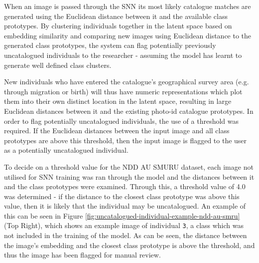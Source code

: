 When an image is passed through the SNN its most likely catalogue matches are generated using the Euclidean distance between it and the available class prototypes. By clustering individuals together in the latent space based on embedding similarity and comparing new images using Euclidean distance to the generated class prototypes, the system can flag potentially previously uncatalogued individuals to the researcher - assuming the model has learnt to generate well defined class clusters. 

New individuals who have entered the catalogue's geographical survey area (e.g. through migration or birth) will thus have numeric representations which plot them into their own distinct location in the latent space, resulting in large Euclidean distances between it and the existing photo-id catalogue prototypes. In order to flag potentially uncatalogued individuals, the use of a threshold was required. If the Euclidean distances between the input image and all class prototypes are above this threshold, then the input image is flagged to the user as a potentially uncatalogued individual. 

To decide on a threshold value for the NDD AU SMURU dataset, each image not utilised for SNN training was ran through the model and the distances between it and the class prototypes were examined. Through this, a threshold value of 4.0 was determined - if the distance to the closest class prototype was above this value, then it is likely that the individual may be uncatalogued. An example of this can be seen in Figure \ref{fig:uncatalogued-individual-example-ndd-au-smru} (Top Right), which shows an example image of individual \texttt{3}, a class which was not included in the training of the model. As can be seen, the distance between the image's embedding and the closest class prototype is above the threshold, and thus the image has been flagged for manual review.

